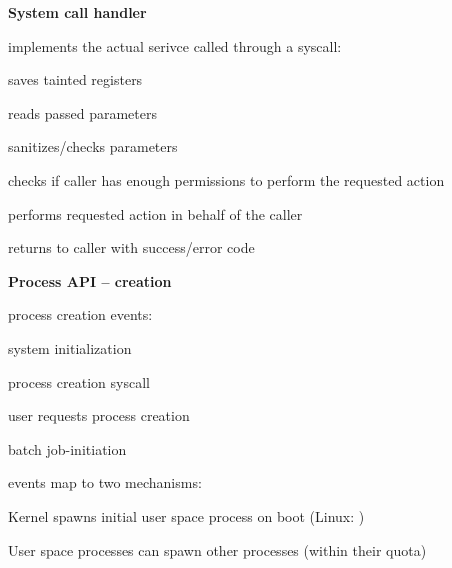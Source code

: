 \textbf{System call handler}
\begin{items}
  \item implements the actual serivce called through a syscall:
  \begin{enumeration}
    \item saves tainted registers
    \item reads passed parameters
    \item sanitizes/checks parameters
    \item checks if caller has enough permissions to perform the requested action
    \item performs requested action in behalf of the caller
    \item returns to caller with success/error code
  \end{enumeration}
\end{items}

\textbf{Process API -- creation}
\begin{items}
  \item process creation events:
  \begin{enumeration}
    \item system initialization
    \item process creation syscall
    \item user requests process creation
    \item batch job-initiation
  \end{enumeration}
  \item events map to two mechanisms:
  \begin{enumeration}
    \item Kernel spawns initial user space process on boot (Linux: )
    \item User space processes can spawn other processes (within their quota)
  \end{enumeration}
\end{items}

